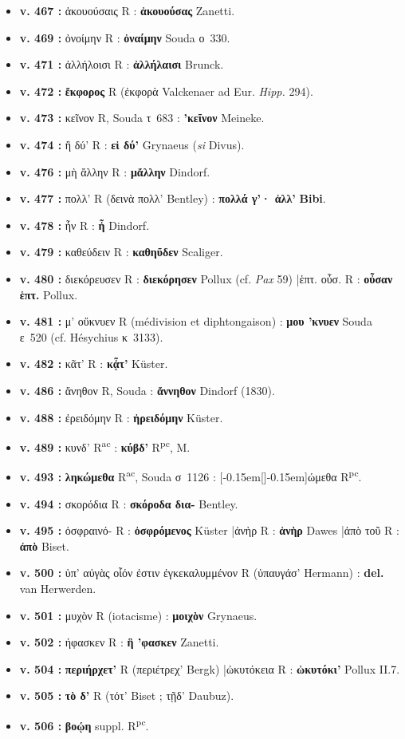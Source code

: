 \documentclass[10pt, a4paper, twoside]{book}
\renewcommand{\_}{\origunderscore\penalty0\relax}
\providecommand{\italique}[1]{\emph{#1}}
\providecommand{\lecon}[1]{\textbf{#1}}
\providecommand{\expo}[1]{\textsuperscript{#1}}
\providecommand{\Rac}{R\expo{ac}}
\providecommand{\Rpc}{R\expo{pc}}
\providecommand{\Mon}{M}
\providecommand{\espApp}{\hspace{0.5em}|\hspace{0.5em}}
\providecommand{\inRas}[2]{[\kern-0.15em[\text{#1}]\kern-0.15em]\text{#2}}
\begin{document}
\begin{itemize}
  \begin{itemize}
    \item \textbf{v. 467 :} ἀκουούσαις R : \lecon{ἀκουούσας} Zanetti.
    \item \textbf{v. 469 :} ὀνοίμην R : \lecon{ὀναίμην} Souda ο~330.
    \item \textbf{v. 471 :} ἀλλήλοισι R : \lecon{ἀλλήλαισι} Brunck.
    \item \textbf{v. 472 :} \lecon{ἔκφορος} R (ἐκφορὰ Valckenaer ad Eur. \italique{Hipp.} 294).
    \item \textbf{v. 473 :} κεῖνον R, Souda τ~683 : \lecon{'κεῖνον} Meineke.
    \item \textbf{v. 474 :} ἢ δύ' R : \lecon{εἰ δύ'} Grynaeus (\italique{si} Divus).
    \item \textbf{v. 476 :} μὴ ἄλλην R : \lecon{μἄλλην} Dindorf.
    \item \textbf{v. 477 :} πολλ' R (δεινὰ πολλ' Bentley) : \lecon{πολλά γ'· ἀλλ'} \lecon{Bibi}.
    \item \textbf{v. 478 :} ἦν R : \lecon{ἦ} Dindorf.
    \item \textbf{v. 479 :} καθεύδειν R : \lecon{καθηῦδεν} Scaliger.
    \item \textbf{v. 480 :} διεκόρευσεν R : \lecon{διεκόρησεν} Pollux (cf. \italique{Pax} 59) \espApp ἑπτ. οὖσ. R : \lecon{οὖσαν ἑπτ.} Pollux.
    \item \textbf{v. 481 :} μ' οὔκνυεν R (médivision et diphtongaison) : \lecon{μου 'κνυεν} Souda ε~520 (cf. Hésychius κ~3133).
    \item \textbf{v. 482 :} κᾶτ' R : \lecon{κᾆτ'} Küster.
    \item \textbf{v. 486 :} ἄνηθον R, Souda : \lecon{ἄννηθον} Dindorf (1830).
    \item \textbf{v. 488 :} ἐρειδόμην R : \lecon{ἠρειδόμην} Küster.
    \item \textbf{v. 489 :} κυνδ' \Rac{} : \lecon{κύβδ'} \Rpc{}, \Mon{}.
    \item \textbf{v. 493 :} \lecon{ληκώμεθα} \Rac{}, Souda σ~1126 : \inRas{ληκ}{κιν}ώμεθα \Rpc{}.
    \item \textbf{v. 494 :} σκορόδια R : \lecon{σκόροδα δια-} Bentley.
    \item \textbf{v. 495 :} ὀσφραινό- R : \lecon{ὀσφρόμενος} Küster \espApp ἀνὴρ R : \lecon{ἁνὴρ} Dawes \espApp ἀπὸ τοῦ R : \lecon{ἀπὸ} Biset.
    \item \textbf{v. 500 :} ὑπ' αὐγὰς οἷόν ἐστιν ἐγκεκαλυμμένον R (ὑπαυγάσ' Hermann) : \lecon{del.} van Herwerden.
    \item \textbf{v. 501 :} μυχὸν R (iotacisme) : \lecon{μοιχὸν} Grynaeus.
    \item \textbf{v. 502 :} ήφασκεν R : \lecon{ἣ 'φασκεν} Zanetti.
    \item \textbf{v. 504 :} \lecon{περιήρχετ'} R (περιέτρεχ' Bergk) \espApp ὠκυτόκεια R : \lecon{ὠκυτόκι'} Pollux II.7.
    \item \textbf{v. 505 :} \lecon{τὸ δ'} R (τότ' Biset ; τῇδ' Daubuz).
    \item \textbf{v. 506 :} \lecon{βοῴη} suppl. \Rpc{}.
  \end{itemize}
\end{itemize}
\end{document}
